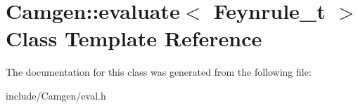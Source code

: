 \hypertarget{a00141}{}\section{Camgen\+:\+:evaluate$<$ Feynrule\+\_\+t $>$ Class Template Reference}
\label{a00141}


The documentation for this class was generated from the following file\+:\begin{DoxyCompactItemize}
\item 
include/\+Camgen/eval.\+h\end{DoxyCompactItemize}
